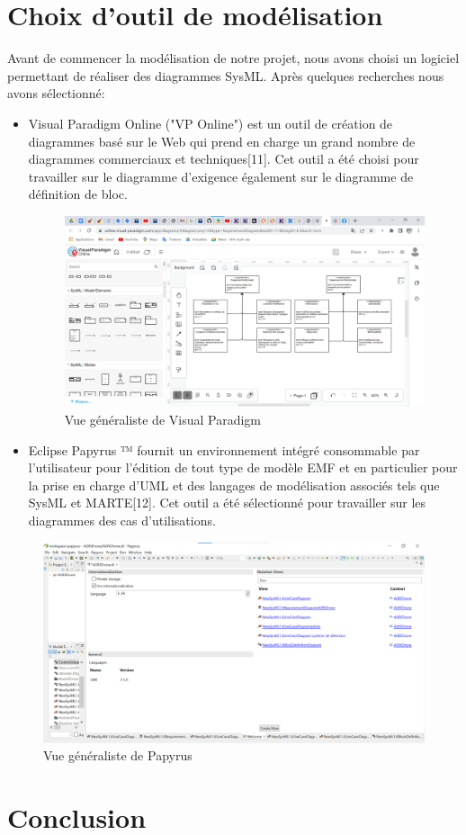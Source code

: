 \section{Choix d'outil de modélisation }
Avant de commencer la modélisation de notre projet, nous avons choisi un logiciel permettant de réaliser des diagrammes SysML. Après  quelques  recherches  nous avons   sélectionné:
\begin{itemize}
	\item Visual Paradigm Online ("VP Online") est un outil de création de diagrammes basé sur le Web qui prend en charge un grand nombre de diagrammes commerciaux et techniques[11]. Cet outil a été choisi pour travailler sur le diagramme d'exigence également sur le diagramme de définition de bloc.
	
	\begin{figure} [h]
		\begin{center}
			\centering	
			\includegraphics[width=0.8\linewidth]{Images/Visual Paradigm}
		\end{center}
		
		\caption{Vue généraliste de Visual Paradigm}
	\end{figure}
	
	
	\item Eclipse Papyrus ™ fournit un environnement intégré consommable par l'utilisateur pour l'édition de tout type de modèle EMF et en particulier pour la prise en charge d'UML et des langages de modélisation associés tels que SysML et MARTE[12]. Cet outil a été sélectionné pour travailler sur les diagrammes des cas d'utilisations.
\end{itemize}
\begin{figure} [h]
	\begin{center}
		\centering	
		\includegraphics[width=0.8\linewidth]{Images/papyrus}
	\end{center}
	\caption{Vue généraliste de Papyrus}
\end{figure}	
\section{Conclusion}
	

	

	

